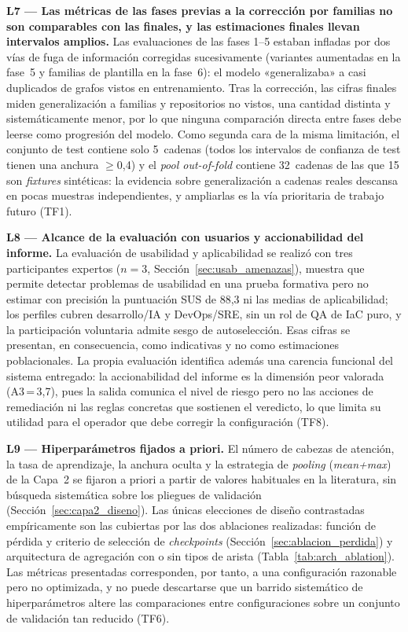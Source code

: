 \textbf{L7 — Las métricas de las fases previas a la corrección por familias no
son comparables con las finales, y las estimaciones finales llevan intervalos
amplios.} Las evaluaciones de las fases 1--5 estaban infladas por dos vías de
fuga de información corregidas sucesivamente (variantes aumentadas en la fase~5
y familias de plantilla en la fase~6): el modelo «generalizaba» a casi duplicados
de grafos vistos en entrenamiento. Tras la corrección, las cifras finales miden
generalización a familias y repositorios no vistos, una cantidad distinta y
sistemáticamente menor, por lo que ninguna comparación directa entre fases debe
leerse como progresión del modelo. Como segunda cara de la misma limitación, el
conjunto de test contiene solo 5~cadenas (todos los intervalos de confianza de
test tienen una anchura \(\geq\)0,4) y el \textit{pool out-of-fold} contiene
32~cadenas de las que 15 son \textit{fixtures} sintéticas: la evidencia sobre
generalización a cadenas reales descansa en pocas muestras independientes, y
ampliarlas es la vía prioritaria de trabajo futuro (TF1).

\textbf{L8 — Alcance de la evaluación con usuarios y accionabilidad del informe.}
La evaluación de usabilidad y aplicabilidad se realizó con tres participantes
expertos (\(n=3\), Sección~\ref{sec:usab_amenazas}), muestra que permite detectar
problemas de usabilidad en una prueba formativa pero no estimar con precisión la
puntuación SUS de 88,3 ni las medias de aplicabilidad; los perfiles cubren
desarrollo/IA y DevOps/SRE, sin un rol de \ac{QA} de \ac{IaC} puro, y la
participación voluntaria admite sesgo de autoselección. Esas cifras se presentan, en
consecuencia, como indicativas y no como estimaciones poblacionales. La propia
evaluación identifica además una carencia funcional del sistema entregado: la
accionabilidad del informe es la dimensión peor valorada (A3\,=\,3,7), pues la
salida comunica el nivel de riesgo pero no las acciones de remediación ni las
reglas concretas que sostienen el veredicto, lo que limita su utilidad para el
operador que debe corregir la configuración (TF8).

\textbf{L9 — Hiperparámetros fijados a priori.} El número de cabezas de atención,
la tasa de aprendizaje, la anchura oculta y la estrategia de \textit{pooling}
(\textit{mean+max}) de la Capa~2 se fijaron a priori a partir de valores habituales
en la literatura, sin búsqueda sistemática sobre los pliegues de validación
(Sección~\ref{sec:capa2_diseno}). Las únicas elecciones de diseño contrastadas
empíricamente son las cubiertas por las dos ablaciones realizadas: función de
pérdida y criterio de selección de \textit{checkpoints}
(Sección~\ref{sec:ablacion_perdida}) y arquitectura de agregación con o sin tipos de
arista (Tabla~\ref{tab:arch_ablation}). Las métricas presentadas corresponden, por
tanto, a una configuración razonable pero no optimizada, y no puede descartarse que
un barrido sistemático de hiperparámetros altere las comparaciones entre
configuraciones sobre un conjunto de validación tan reducido (TF6).

